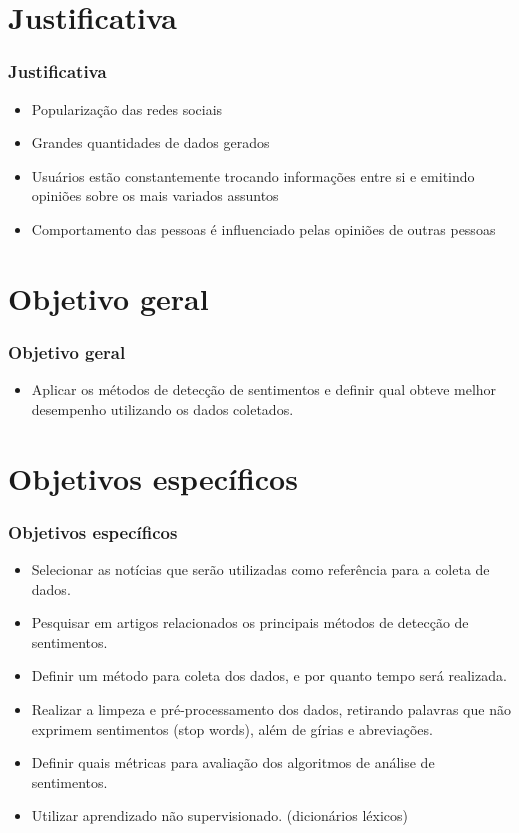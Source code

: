 \documentclass{beamer}
\begin{document}
\section{Justificativa}
\begin{frame}%
\frametitle{\textbf{Justificativa}\transdissolve}%
\begin{itemize}%
\item<1->Popularização das redes sociais
\item<2->Grandes quantidades de dados gerados
\item<3->Usuários estão constantemente trocando informações entre si e emitindo opiniões sobre os mais variados assuntos
\item<4->Comportamento das pessoas é influenciado pelas opiniões de outras pessoas
\end{itemize}

\end{frame}

\section{Objetivo geral}
\begin{frame}%
\frametitle{\textbf{Objetivo geral}\transdissolve}%
\begin{itemize}%
\item<1->Aplicar os métodos de detecção de sentimentos e definir qual obteve melhor desempenho utilizando os dados coletados.
\end{itemize}

\end{frame}

\section{Objetivos específicos}
\begin{frame}%
\frametitle{\textbf{Objetivos específicos}\transdissolve}%
\begin{itemize}%
\item<1->Selecionar as notícias que serão utilizadas como referência para a coleta de
dados.
\item<2->Pesquisar em artigos relacionados os principais métodos de detecção de sentimentos.
\item<3->Definir um método para coleta dos dados, e por quanto tempo será realizada.
\item<4->Realizar a limpeza e pré-processamento dos dados, retirando palavras que não exprimem sentimentos (stop words), além de gírias e abreviações.
\item<5->Definir quais métricas para avaliação dos algoritmos de análise de sentimentos.
\item<6->Utilizar aprendizado não supervisionado. (dicionários léxicos)
\end{itemize}

\end{frame}
\end{document}

